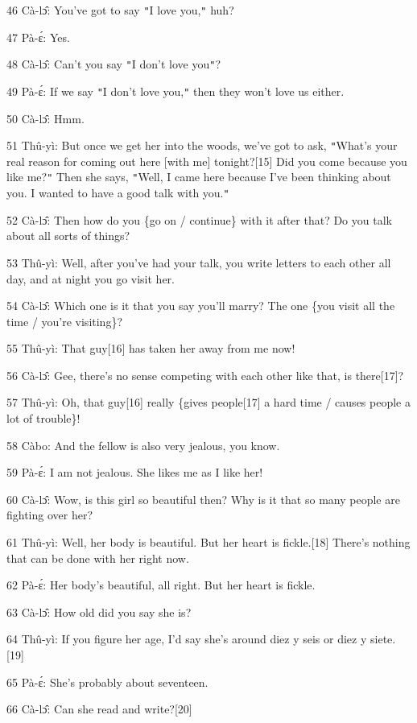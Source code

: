 46 Cà-lɔ̂: You've got to say \texttt{"}I love you,\texttt{"} huh?

47 Pà-ɛ́: Yes.

48 Cà-lɔ̂: Can't you say \texttt{"}I don't love you\texttt{"}?

49 Pà-ɛ́: If we say \texttt{"}I don't love you,\texttt{"} then they won't love
us either.

50 Cà-lɔ̂: Hmm.

51 Thû-yì: But once we get her into the woods, we've got to ask, \texttt{"}What's
your real reason for coming out here [with me] tonight?[15] Did you come because
you like me?\texttt{"} Then she says, \texttt{"}Well, I came here because I've
been thinking about you. I wanted to have a good talk with you.\texttt{"}

52 Cà-lɔ̂: Then how do you \{go on / continue\} with it after that? Do you talk
about all sorts of things?

53 Thû-yì: Well, after you've had your talk, you write letters to each other
all day, and at night you go visit her.

54 Cà-lɔ̂: Which one is it that you say you'll marry? The one \{you visit all
the time / you're visiting\}?

55 Thû-yì: That guy[16] has taken her away from me now!

56 Cà-lɔ̂: Gee, there's no sense competing with each other like that, is there[17]?

57 Thû-yì: Oh, that guy[16] really \{gives people[17] a hard time / causes people
a lot of trouble\}!

58 Càbo: And the fellow is also very jealous, you know.

59 Pà-ɛ́: I am not jealous. She likes me as I like her!

60 Cà-lɔ̂: Wow, is this girl so beautiful then? Why is it that so many people
are fighting over her?

61 Thû-yì: Well, her body is beautiful. But her heart is fickle.[18] There's
nothing that can be done with her right now.

62 Pà-ɛ́: Her body's beautiful, all right. But her heart is fickle.

63 Cà-lɔ̂: How old did you say she is?

64 Thû-yì: If you figure her age, I'd say she's around diez y seis or diez y
siete.[19]

65 Pà-ɛ́: She's probably about seventeen.

66 Cà-lɔ̂: Can she read and write?[20]

